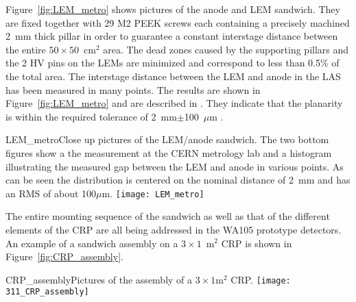 Figure~\ref{fig:LEM_metro} shows pictures of the anode and LEM
sandwich.  They are fixed together with 29 M2 PEEK screws each
containing a precisely machined 2~mm thick pillar in order to
guarantee a constant interstage distance between the entire
$50\times50$~cm$^2$ area. The dead zones caused by the supporting
pillars and the 2 HV pins on the LEMs are minimized and correspond to
less than 0.5\% of the total area. The interstage distance between the
LEM and anode in the LAS has been measured in many points. The results
are shown in Figure~\ref{fig:LEM_metro} and are described in
\cite{EDMS_metro_lem_anode}. They indicate that the planarity is
within the required tolerance of 2~mm$\pm$100~$\mu$m .
\begin{cdrfigure}{LEM_metro}{Close up pictures of the LEM/anode sandwich. The two
       bottom figures show a the measurement at the CERN metrology lab
       and a histogram illustrating the measured gap between the LEM
       and anode in various points. As can be seen the distribution is
       centered on the nominal distance of 2~mm and has an RMS of
       about 100$\mu$m.}
     \texttt{[image: LEM\_metro]}
\end{cdrfigure}

The entire mounting sequence of the sandwich as well as that of the
different elements of the CRP are all being addressed in the WA105
prototype detectors. An example of a sandwich assembly on a
$3\times1$~m$^2$ CRP is shown in Figure~\ref{fig:CRP_assembly}.
\begin{cdrfigure}{CRP_assembly}{Pictures of the assembly of a $3\times1$m$^2$ CRP.}
     \texttt{[image: 311\_CRP\_assembly]}  
\end{cdrfigure}
